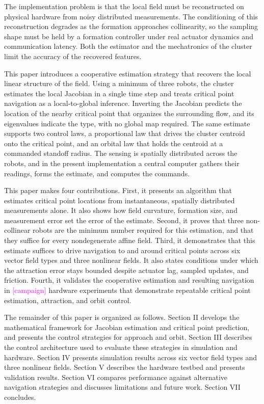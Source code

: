 \documentclass[lettersize,journal]{IEEEtran}
\newcommand{\open}[1]{\textcolor{magenta}{[#1]}}
\begin{document}
The implementation problem is that the local field must be reconstructed on physical hardware from noisy distributed measurements. The conditioning of this reconstruction degrades as the formation approaches collinearity, so the sampling shape must be held by a formation controller under real actuator dynamics and communication latency. Both the estimator and the mechatronics of the cluster limit the accuracy of the recovered features.

This paper introduces a cooperative estimation strategy that recovers the local linear structure of the field. Using a minimum of three robots, the cluster estimates the local Jacobian in a single time step and treats critical point navigation as a local-to-global inference. Inverting the Jacobian predicts the location of the nearby critical point that organizes the surrounding flow, and its eigenvalues indicate the type, with no global map required. The same estimate supports two control laws, a proportional law that drives the cluster centroid onto the critical point, and an orbital law that holds the centroid at a commanded standoff radius. The sensing is spatially distributed across the robots, and in the present implementation a central computer gathers their readings, forms the estimate, and computes the commands.

This paper makes four contributions. First, it presents an algorithm that estimates critical point locations from instantaneous, spatially distributed measurements alone. It also shows how field curvature, formation size, and measurement error set the error of the estimate. Second, it proves that three non-collinear robots are the minimum number required for this estimation, and that they suffice for every nondegenerate affine field. Third, it demonstrates that this estimate suffices to drive navigation to and around critical points across six vector field types and three nonlinear fields. It also states conditions under which the attraction error stays bounded despite actuator lag, sampled updates, and friction. Fourth, it validates the cooperative estimation and resulting navigation in \open{campaign} hardware experiments that demonstrate repeatable critical point estimation, attraction, and orbit control.

The remainder of this paper is organized as follows. Section II develops the mathematical framework for Jacobian estimation and critical point prediction, and presents the control strategies for approach and orbit. Section III describes the control architecture used to evaluate these strategies in simulation and hardware. Section IV presents simulation results across six vector field types and three nonlinear fields. Section V describes the hardware testbed and presents validation results. Section VI compares performance against alternative navigation strategies and discusses limitations and future work. Section VII concludes.
\end{document}
